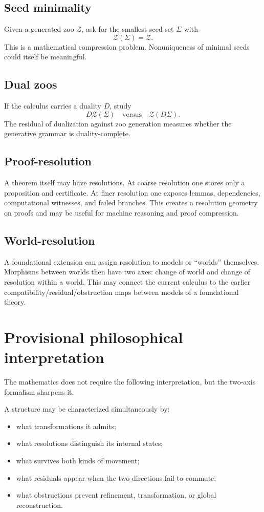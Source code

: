\documentclass[11pt]{article}
\theoremstyle{definition}
\theoremstyle{remark}
\newcommand{\Zoo}{\mathcal Z}
\newcommand{\Seeds}{\Sigma}
\begin{document}
\subsection{Seed minimality}
Given a generated zoo $\Zoo$, ask for the smallest seed set $\Seeds$ with
\[
\Zoo(\Seeds)=\Zoo.
\]
This is a mathematical compression problem. Nonuniqueness of minimal seeds could itself be meaningful.

\subsection{Dual zoos}
If the calculus carries a duality $D$, study
\[
D\Zoo(\Seeds)
\quad\text{versus}\quad
\Zoo(D\Seeds).
\]
The residual of dualization against zoo generation measures whether the generative grammar is duality-complete.

\subsection{Proof-resolution}
A theorem itself may have resolutions. At coarse resolution one stores only a proposition and certificate. At finer resolution one exposes lemmas, dependencies, computational witnesses, and failed branches. This creates a resolution geometry on proofs and may be useful for machine reasoning and proof compression.

\subsection{World-resolution}
A foundational extension can assign resolution to models or ``worlds'' themselves. Morphisms between worlds then have two axes: change of world and change of resolution within a world. This may connect the current calculus to the earlier compatibility/residual/obstruction maps between models of a foundational theory.

\section{Provisional philosophical interpretation}

The mathematics does not require the following interpretation, but the two-axis formalism sharpens it.

A structure may be characterized simultaneously by:
\begin{itemize}
    \item what transformations it admits;
    \item what resolutions distinguish its internal states;
    \item what survives both kinds of movement;
    \item what residuals appear when the two directions fail to commute;
    \item what obstructions prevent refinement, transformation, or global reconstruction.
\end{itemize}
\end{document}
